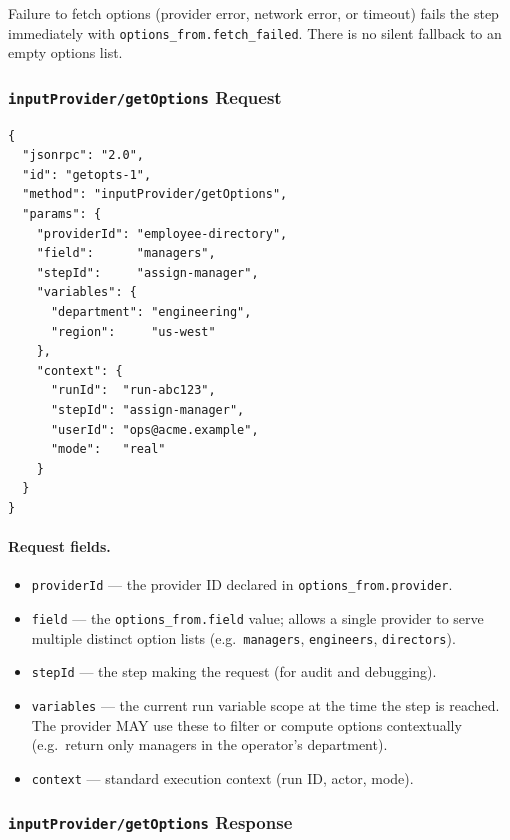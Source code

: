 Failure to fetch options (provider error, network error, or timeout) fails the step
immediately with \texttt{options\_from.fetch\_failed}.  There is no silent fallback to
an empty options list.

\subsubsection*{\texttt{inputProvider/getOptions} Request}

\begin{verbatim}
{
  "jsonrpc": "2.0",
  "id": "getopts-1",
  "method": "inputProvider/getOptions",
  "params": {
    "providerId": "employee-directory",
    "field":      "managers",
    "stepId":     "assign-manager",
    "variables": {
      "department": "engineering",
      "region":     "us-west"
    },
    "context": {
      "runId":  "run-abc123",
      "stepId": "assign-manager",
      "userId": "ops@acme.example",
      "mode":   "real"
    }
  }
}
\end{verbatim}

\paragraph{Request fields.}
\begin{itemize}
  \item \texttt{providerId} — the provider ID declared in
        \texttt{options\_from.provider}.
  \item \texttt{field} — the \texttt{options\_from.field} value; allows a single
        provider to serve multiple distinct option lists (e.g.\ \texttt{managers},
        \texttt{engineers}, \texttt{directors}).
  \item \texttt{stepId} — the step making the request (for audit and debugging).
  \item \texttt{variables} — the current run variable scope at the time the step is
        reached.  The provider MAY use these to filter or compute options contextually
        (e.g.\ return only managers in the operator's department).
  \item \texttt{context} — standard execution context (run ID, actor, mode).
\end{itemize}

\subsubsection*{\texttt{inputProvider/getOptions} Response}

